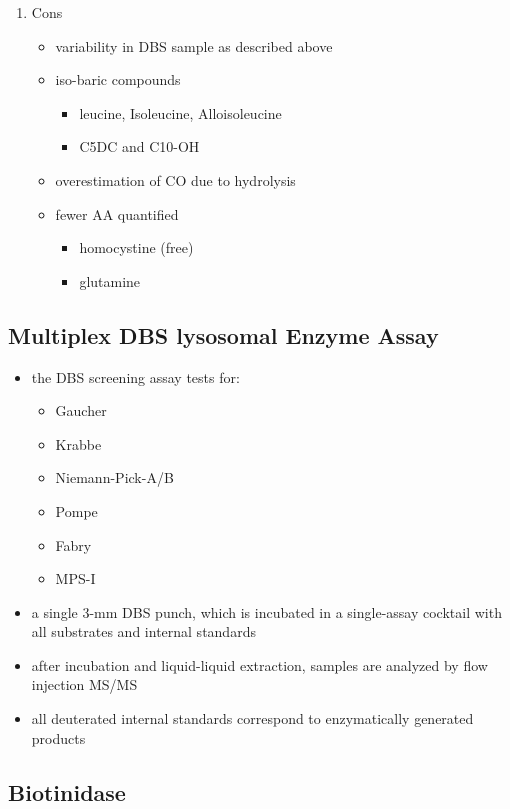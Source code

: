 \documentclass{scrartcl}
\begin{document}
\begin{enumerate}
\begin{enumerate}
\item Cons
\label{sec:org9787244}
\begin{itemize}
\item variability in DBS sample as described above
\item iso-baric compounds
\begin{itemize}
\item leucine, Isoleucine, Alloisoleucine
\item C5DC and C10-OH
\end{itemize}
\item overestimation of CO due to hydrolysis
\item fewer AA quantified
\begin{itemize}
\item homocystine (free)
\item glutamine
\end{itemize}
\end{itemize}
\end{enumerate}
\end{enumerate}

\subsection{Multiplex DBS lysosomal Enzyme Assay}
\label{sec:orge94ec88}
\begin{itemize}
\item the DBS screening assay tests for:
\begin{itemize}
\item Gaucher
\item Krabbe
\item Niemann-Pick-A/B
\item Pompe
\item Fabry
\item MPS-I
\end{itemize}
\item a single 3-mm DBS punch, which is incubated in a single-assay
cocktail with all substrates and internal standards
\item after incubation and liquid-liquid extraction, samples are analyzed by flow injection MS/MS
\item all deuterated internal standards correspond to enzymatically generated products
\end{itemize}
\subsection{Biotinidase}
\label{sec:org91e9000}
\end{document}
